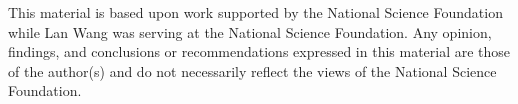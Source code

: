 This material is based upon work supported by the National Science Foundation while Lan Wang was serving at the National Science Foundation. Any opinion, findings, and conclusions or recommendations expressed in this material are those of the author(s) and do not necessarily reflect the views of the National Science Foundation.
